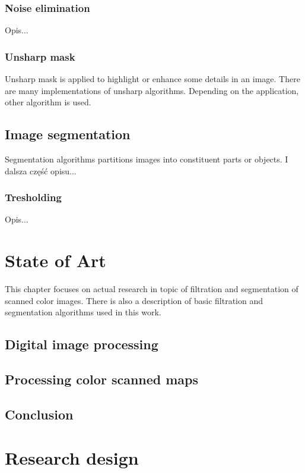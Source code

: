 \documentclass[a4paper,onecolumn,oneside,12pt]{memoir}
\begin{document}
\subsection{Noise elimination}

Opis...

\subsection{Unsharp mask}

Unsharp mask is applied to highlight or enhance some details in an image. There are many 
implementations of unsharp algorithms. Depending on the application, other algorithm is used.

\section{Image segmentation}

Segmentation algorithms partitions images into constituent parts or objects. I dalsza część opisu...

\subsection{Tresholding}

Opis...



\chapter{State of Art}

This chapter focuses on actual research in topic of filtration and segmentation of scanned color
images. There is also a description of basic filtration and segmentation algorithms used in this
work.

\section{Digital image processing}

\section{Processing color scanned maps}

\section{Conclusion}


\chapter{Research design}
\end{document}
